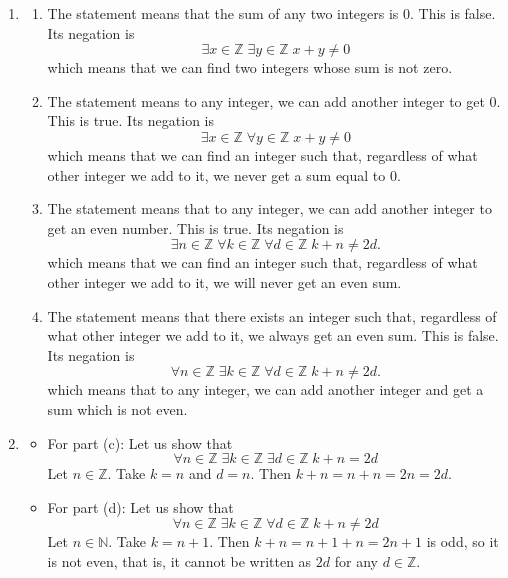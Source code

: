 \documentclass{article}
\newcommand{\Z}{\mathbb{Z}}
\newcommand{\N}{\mathbb{N}}
\theoremstyle{definition}
\begin{document}
\begin{solution}
\begin{enumerate}
	\item 
	\begin{enumerate}
		\item The statement means that the sum of any two integers is 0. This is false. Its negation is
		\[
		\exists x \in \Z \; \exists y \in \Z \; x + y \neq 0
		\]
		which means that we can find two integers whose sum is not zero.
		
		\item The statement means to any integer, we can add another integer to get 0. This is true. Its negation is
		\[
		\exists x \in \Z \; \forall y \in \Z \; x + y \neq 0
		\]
		which means that we can find an integer such that, regardless of what other integer we add to it, we never get a sum equal to 0.
		
		
		\item The statement means that to any integer, we can add another integer to get an even number. This is true. Its negation is
		\[
		\exists n \in \Z \; \forall k \in \Z \; \forall d \in \Z \; k + n \neq 2d.
		\]
		which means that we can find an integer such that, regardless of what other integer we add to it, we will never get an  even sum.
		
		\item The statement means that there exists an integer such that, regardless of what other integer we add to it, we always get an even sum. This is false. Its negation is
		\[
		\forall n \in \Z \; \exists k \in \Z \; \forall d \in \Z \; k + n \neq 2d.
		\]
		which means that to any integer, we can add another integer and get a sum which is not even.
		
	\end{enumerate}
	\item \begin{itemize}
		\item For part (c): Let us show that
		\[
		\forall n \in \Z \; \exists k \in \Z \; \exists d \in \Z \; k + n = 2d
		\]
		Let $n \in \Z$. Take $k = n$ and $d = n$. Then $k+n = n + n = 2n = 2d$.
		
		\item For part (d): Let us show that
		\[
		\forall n \in \Z \; \exists k \in \Z \; \forall d \in \Z \; k + n \neq 2d
		\]
		Let $n \in \N$. Take $k = n + 1$. Then $k + n = n+1+n = 2n + 1$ is odd, so it is not even, that is, it cannot be written as $2d$ for any $d \in \Z$.
		
	\end{itemize}
	
\end{enumerate}
\end{solution}
\end{document}

